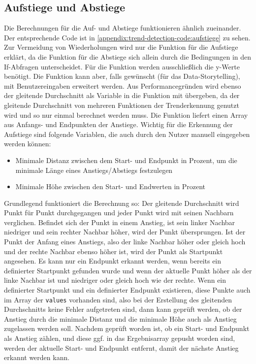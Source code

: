 \subsection{Aufstiege und Abstiege}
\label{subsection:risesAndFalls}
Die Berechnungen für die Auf- und Abstiege funktionieren ähnlich zueinander. Der entsprechende Code ist in \ref{appendix:trend-detection-code:aufstiege} zu sehen. Zur Vermeidung von Wiederholungen wird nur die Funktion für die Aufstiege erklärt, da die Funktion für die Abstiege sich allein durch die Bedingungen in den If-Abfragen unterscheidet. Für die Funktion werden ausschließlich die y-Werte benötigt. Die Funktion kann aber, falls gewünscht (für das Data-Storytelling), mit Benutzereingaben erweitert werden. Aus Performancegründen wird ebenso der gleitende Durchschnitt als Variable in die Funktion mit übergeben, da der gleitende Durchschnitt von mehreren Funktionen der Trenderkennung genutzt wird und so nur einmal berechnet werden muss. Die Funktion liefert einen Array aus Anfangs- und Endpunkten der Anstiege. Wichtig für die Erkennung der Aufstiege sind folgende Variablen, die auch durch den Nutzer manuell eingegeben werden können:
\begin{itemize}
    \item Minimale Distanz zwischen dem Start- und Endpunkt in Prozent, um die minimale Länge eines Anstiegs/Abstiegs festzulegen
    \item Minimale Höhe zwischen den Start- und Endwerten in Prozent
\end{itemize}
Grundlegend funktioniert die Berechnung so: Der gleitende Durchschnitt wird Punkt für Punkt durchgegangen und jeder Punkt wird mit seinen Nachbarn verglichen. Befindet sich der Punkt in einem Anstieg, ist sein linker Nachbar niedriger und sein rechter Nachbar höher, wird der Punkt übersprungen. Ist der Punkt der Anfang eines Anstiegs, also der linke Nachbar höher oder gleich hoch und der rechte Nachbar ebenso höher ist, wird der Punkt als Startpunkt angesehen. Es kann nur ein Endpunkt erkannt werden, wenn bereits ein definierter Startpunkt gefunden wurde und wenn der aktuelle Punkt höher als der linke Nachbar ist und niedriger oder gleich hoch wie der rechte. Wenn ein definierter Startpunkt und ein definierter Endpunkt existieren, diese Punkte auch im Array der \texttt{values} vorhanden sind, also bei der Erstellung des gleitenden Durchschnitts keine Fehler aufgetreten sind, dann kann geprüft werden, ob der Anstieg durch die minimale Distanz und die minimale Höhe auch als Anstieg zugelassen werden soll. Nachdem geprüft worden ist, ob ein Start- und Endpunkt als Anstieg zählen, und diese ggf. in das Ergebnisarray \glqq gepusht\grqq{} worden sind, werden der aktuelle Start- und Endpunkt entfernt, damit der nächste Anstieg erkannt werden kann.
